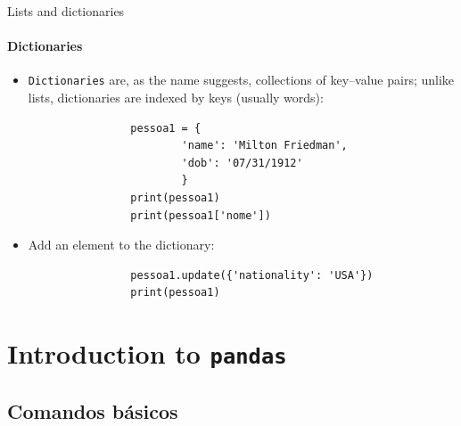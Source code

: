 \documentclass[notes,11pt, aspectratio=169, xcolor=table]{beamer}
\begin{document}
    \begin{frame}[fragile=singleslide]{Lists and dictionaries}
    \framesubtitle{Dictionaries}
        
         \begin{itemize}
            \item \texttt{Dictionaries} are, as the name suggests, collections of key–value pairs; unlike lists, dictionaries are indexed by keys (usually words):

                \begin{verbatim}
                pessoa1 = {
                        'name': 'Milton Friedman',
                        'dob': '07/31/1912'
                        }
                print(pessoa1)
                print(pessoa1['nome'])
                \end{verbatim}    

            \item Add an element to the dictionary:

                \begin{verbatim}
                pessoa1.update({'nationality': 'USA'})
                print(pessoa1)
                \end{verbatim}    

        \end{itemize}             

    
   

    \end{frame}

    \section{Introduction to \texttt{pandas}}

        \subsection{Comandos básicos}
\end{document}

